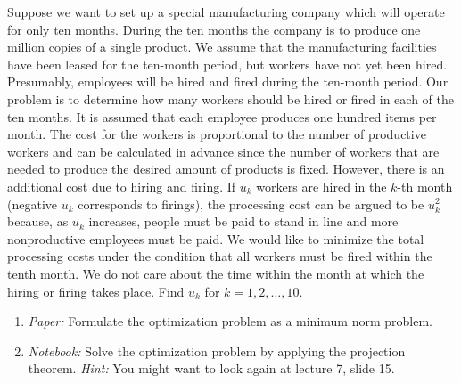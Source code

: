 \begin{exercise}[subtitle={Paper + Notebook}]
Suppose we want to set up a special manufacturing company which will
operate for only ten months. During the ten months the company is to
produce one million copies of a single product. We assume that the
manufacturing facilities have been leased for the ten-month period, but
workers have not yet been hired. Presumably, employees will be hired and fired during the ten-month period. Our problem is to determine how many workers should be hired or fired in each of the ten months.
It is assumed that each employee produces one hundred items per
month. The cost for the workers is proportional to the number of productive
workers and can be calculated in advance since the number of workers that are needed to produce the desired amount of products is fixed. However, there is an additional cost due to hiring and firing. If
$u_k$ workers are hired in the $k$-th month (negative $u_k$ corresponds to
firings), the processing cost can be argued to be $u^2_k$ because, as $u_k$
increases, people must be paid to stand in line and more nonproductive
employees must be paid. We would like to minimize the total processing costs under the condition that all workers must be fired within the tenth month. We do not care about the time within the month at which the hiring or firing takes place. 
Find $u_k$ for $k = 1,2,\dots ,10$.

\begin{enumerate}[label=\emph{\alph*)}]
\item \textit{Paper:} Formulate the optimization problem as a minimum norm problem.
\item \textit{Notebook:} Solve the optimization problem by applying the projection theorem. \textit{Hint:} You might want to look again at lecture 7, slide 15. 
\end{enumerate}
\end{exercise}

